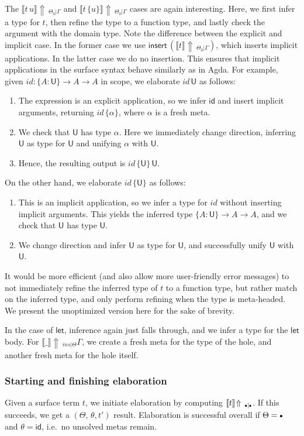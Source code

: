 \documentclass[acmsmall,review,anonymous,prologue,dvipsnames]{acmart}\settopmatter{printfolios=true,printccs=false,printacmref=false}
\newcommand{\slet}{\boldsymbol{\mathsf{let}}}
\renewcommand{\U}{\mathsf{U}}
\newcommand{\emptycon}{\scaleobj{.75}\bullet}
\newcommand{\id}{\mathsf{id}}
\newcommand{\einfer}[3]{\llbracket#1\rrbracket\!\Uparrow\,_{#2|#3}}
\newcommand{\einsert}{\mathsf{insert}}
\theoremstyle{remark}
\begin{document}
The $\einfer{t\,u}{\Theta_0}{\Gamma}$ and $\einfer{t\,\{u\}}{\Theta_0}{\Gamma}$
cases are again interesting. Here, we first infer a type for $t$, then refine
the type to a function type, and lastly check the argument with the domain
type. Note the difference between the explicit and implicit case. In the former
case we use $\einsert\,(\einfer{t}{\Theta_0}{\Gamma})$, which inserts implicit
applications. In the latter case we do no insertion. This ensures that implicit
applications in the surface syntax behave similarly as in Agda. For example,
given $id : \{A : \U\}\to A\to A$ in scope, we elaborate $id\,\U$ as follows:
\begin{enumerate}
  \item The expression is an explicit application, so we infer $\id$ and insert implicit
        arguments, returning $id\,\{\alpha\}$, where $\alpha$ is a fresh meta.
  \item We check that $\U$ has type $\alpha$. Here we immediately change direction,
        inferring $\U$ as type for $\U$ and unifying $\alpha$ with $\U$.
  \item Hence, the resulting output is $id\,\{\U\}\,\U$.
\end{enumerate}
On the other hand, we elaborate $id\,\{\U\}$ as follows:
\begin{enumerate}
  \item This is an implicit application, so we infer a type for $id$ without inserting
    implicit arguments. This yields the inferred type $\{A : \U\}\to A\to A$, and
    we check that $\U$ has type $\U$.
  \item We change direction and infer $\U$ as type for $\U$, and successfully
    unify $\U$ with $\U$.
\end{enumerate}
It would be more efficient (and also allow more user-friendly error
messages) to not immediately refine the inferred type of $t$ to a function type,
but rather match on the inferred type, and only perform refining when the type
is meta-headed. We present the unoptimized version here for the sake of brevity.

In the case of $\slet$, inference again just falls through, and we infer a type
for the $\slet$ body. For $\einfer{\_}{ins}{\Theta}{\Gamma}$, we create a fresh meta
for the type of the hole, and another fresh meta for the hole itself.

\subsubsection{Starting and finishing elaboration} Given a surface term $t$,
we initiate elaboration by computing $\einfer{t}{\emptycon}{\emptycon}$. If this
succeeds, we get a $(\Theta,\,\theta,t')$ result. Elaboration is successful overall
if $\Theta = \emptycon$ and $\theta = \id$, i.e.\ no unsolved metas remain.
\end{document}
